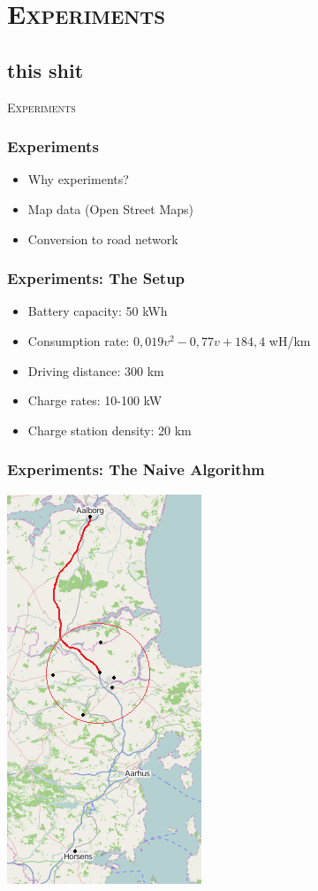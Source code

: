 \section{\scshape Experiments}
\subsection{this shit}

\begin{frame}
\center \huge \scshape Experiments
\end{frame}

\begin{frame}
  \frametitle{Experiments}
  \begin{itemize}
  	\item Why experiments?
  	\item Map data (Open Street Maps)
  	\item Conversion to road network
  \end{itemize}
\end{frame}

\begin{frame}
  \frametitle{Experiments: The Setup} 
  \begin{itemize}
  	\item Battery capacity: 50 kWh
  	\item Consumption rate: $0,019v^2 - 0,77v + 184,4$ wH/km
  	\item Driving distance: 300 km
  	\item Charge rates: 10-100 kW
  	\item Charge station density: 20 km
  \end{itemize}
\end{frame}

\begin{frame}
  \frametitle{Experiments: The Naive Algorithm}
  \begin{center}
	  \includegraphics[scale=0.6]{images/AalborgtoHorsens1}  
  \end{center}
\end{frame}


